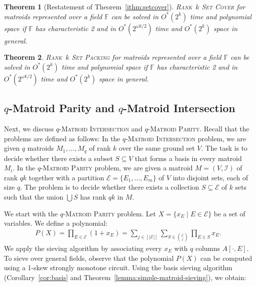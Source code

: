 \documentclass[10pt,a4paper]{article}
\newtheorem{theorem}{Theorem}[section]
\newcommand{\F}{\ensuremath{\mathbb F}\xspace}
\newcommand{\cI}{\ensuremath{\mathcal I}\xspace}
\newcommand{\cE}{\ensuremath{\mathcal E}\xspace}
\begin{document}
\begin{theorem}[Restatement of Theorem~\ref{ithm:setcover}] \label{theoremm:setcover}
  \textsc{Rank~$k$ Set Cover} for
  matroids represented over a field $\F$ can be solved
  in $O^*(2^k)$ time and polynomial space if $\F$ has characteristic 2 and in $O^*(2^{\omega k / 2})$ time and $O^*(2^k)$ space in general. 
\end{theorem}

\begin{theorem} \label{theoremm:setpacking}
  \textsc{Rank~$k$ Set Packing} for
  matroids represented over a field $\F$ can be solved
  in $O^*(2^k)$ time and polynomial space if $\F$ has characteristic 2 and in $O^*(2^{\omega k / 2})$ time and $O^*(2^k)$ space in general. 
\end{theorem}

\subsection{\texorpdfstring{$q$}{q}-Matroid Parity and \texorpdfstring{$q$}{q}-Matroid Intersection}
Next, we discuss \textsc{$q$-Matroid Intersection} and \textsc{$q$-Matroid Parity}.
Recall that the problems are defined as follows:
In the \textsc{$q$-Matroid Intersection} problem, we are given $q$ matroids $M_1, \dots, M_q$ of rank $k$ over the same ground set $V$. The task is to decide whether there exists a subset $S \subseteq V$ that forms a basis in every matroid $M_i$.
In the \textsc{$q$-Matroid Parity} problem, we are given a matroid $M=(V,\cI)$ of rank $qk$ together with a partition $\cE=\{E_1,\dots,E_m\}$ of $V$ into disjoint sets, each of size $q$.
The problem is to decide whether there exists a collection $S\subseteq \cE$ of $k$ sets such that the union $\bigcup S$ has rank $qk$ in $M$.

We start with the \textsc{$q$-Matroid Parity} problem.
Let $X = \{ x_{E} \mid E \in \cE \}$ be a set of variables.
We define a polynomial:
\begin{align*}
  P(X) = \prod_{E \in \cE} \left( 1 +x_E \right)
  = \sum_{j \in [|\cE|]} \sum_{S \in \binom{\cE}{j}} \prod_{E \in S} x_E.
\end{align*}
We apply the sieving algorithm by associating every $x_E$ with $q$ columns $A[\cdot, E]$.
To sieve over general fields, observe that the polynomial $P(X)$ can be computed using a 1-skew strongly monotone circuit.
Using the basis sieving algorithm (Corollary~\ref{cor:basis} and Theorem~\ref{lemma:simple-matroid-sieving}), we obtain:
\end{document}
